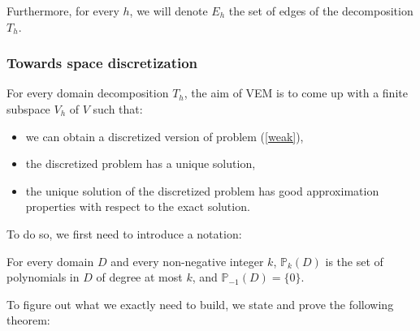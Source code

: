 \noindent Furthermore, for every $h$, we will denote $E_h$ the set of edges of the decomposition $T_h$. 

\subsubsection{Towards space discretization}
For every domain decomposition $T_h$, the aim of VEM is to come up with a finite subspace $V_h$ of $V$ such that:
\begin{itemize}
\item we can obtain a discretized version of problem (\ref{weak}),
\item the discretized problem has a unique solution,
\item the unique solution of the discretized problem has good approximation properties with respect to the exact solution. 
\end{itemize}

\noindent To do so, we first need to introduce a notation:
\begin{notation}
For every domain $D$ and every non-negative integer $k$, $\mathbb{P}_k(D)$ is the set of polynomials in $D$ of degree at most $k$, and $\mathbb{P}_{-1}(D)=\{0\}$.
\end{notation}

\noindent To figure out what we exactly need to build, we state and prove the following theorem: 

